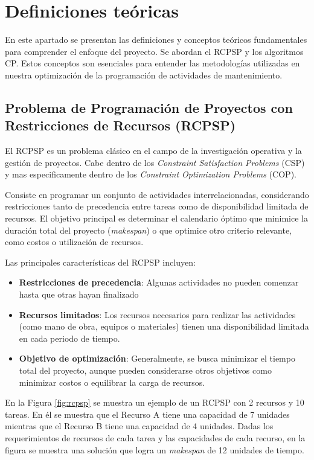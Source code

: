\documentclass{article}
\begin{document}
\section{Definiciones teóricas}
En este apartado se presentan las definiciones y conceptos teóricos fundamentales para comprender el enfoque del proyecto. Se abordan el RCPSP y los algoritmos CP. Estos conceptos son esenciales para entender las metodologías utilizadas en nuestra optimización de la programación de actividades de mantenimiento.

\subsection{Problema de Programación de Proyectos con Restricciones de Recursos (RCPSP)}
El RCPSP es un problema clásico en el campo de la investigación operativa y la gestión de proyectos. Cabe dentro de los \textit{Constraint Satisfaction Problems} (CSP) y mas especificamente dentro de los \textit{Constraint Optimization Problems} (COP).

Consiste en programar un conjunto de actividades interrelacionadas, considerando restricciones tanto de precedencia entre tareas como de disponibilidad limitada de recursos. El objetivo principal es determinar el calendario óptimo que minimice la duración total del proyecto (\textit{makespan}) o que optimice otro criterio relevante, como costos o utilización de recursos\cite{artigues2008resource}.
    

Las principales características del RCPSP incluyen:
\begin{itemize}
  \item \textbf{Restricciones de precedencia}: Algunas actividades no pueden comenzar hasta que otras hayan finalizado
  \item \textbf{Recursos limitados}: Los recursos necesarios para realizar las actividades (como mano de obra, equipos o materiales) tienen una disponibilidad limitada en cada periodo de tiempo.
  \item \textbf{Objetivo de optimización}: Generalmente, se busca minimizar el tiempo total del proyecto, aunque pueden considerarse otros objetivos como minimizar costos o equilibrar la carga de recursos.
\end{itemize}

En la Figura \ref{fig:rcpsp} se muestra un ejemplo de un RCPSP con 2 recursos y 10 tareas. En él se muestra que el Recurso A tiene una capacidad de 7 unidades mientras que el Recurso B tiene una capacidad de 4 unidades. Dadas los requerimientos de recursos de cada tarea y las capacidades de cada recurso, en la figura se muestra una solución que logra un \textit{makespan} de 12 unidades de tiempo.
\end{document}
